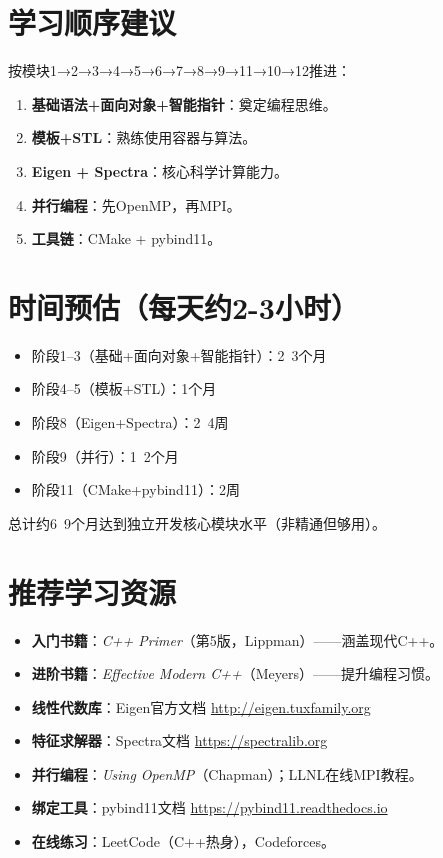 \documentclass[12pt,a4paper]{article}
\begin{document}
\section{学习顺序建议}
按模块1→2→3→4→5→6→7→8→9→11→10→12推进：
\begin{enumerate}
    \item \textbf{基础语法+面向对象+智能指针}：奠定编程思维。
    \item \textbf{模板+STL}：熟练使用容器与算法。
    \item \textbf{Eigen + Spectra}：核心科学计算能力。
    \item \textbf{并行编程}：先OpenMP，再MPI。
    \item \textbf{工具链}：CMake + pybind11。
\end{enumerate}

\section{时间预估（每天约2-3小时）}
\begin{itemize}
    \item 阶段1–3（基础+面向对象+智能指针）：2~3个月
    \item 阶段4–5（模板+STL）：1个月
    \item 阶段8（Eigen+Spectra）：2~4周
    \item 阶段9（并行）：1~2个月
    \item 阶段11（CMake+pybind11）：2周
\end{itemize}
总计约6~9个月达到独立开发核心模块水平（非精通但够用）。

\section{推荐学习资源}
\begin{itemize}
    \item \textbf{入门书籍}：\emph{C++ Primer}（第5版，Lippman）——涵盖现代C++。
    \item \textbf{进阶书籍}：\emph{Effective Modern C++}（Meyers）——提升编程习惯。
    \item \textbf{线性代数库}：Eigen官方文档 \url{http://eigen.tuxfamily.org}
    \item \textbf{特征求解器}：Spectra文档 \url{https://spectralib.org}
    \item \textbf{并行编程}：\emph{Using OpenMP}（Chapman）；LLNL在线MPI教程。
    \item \textbf{绑定工具}：pybind11文档 \url{https://pybind11.readthedocs.io}
    \item \textbf{在线练习}：LeetCode（C++热身），Codeforces。
\end{itemize}
\end{document}
